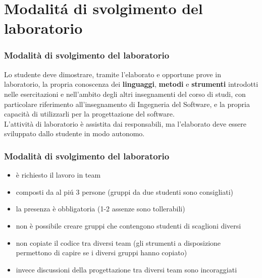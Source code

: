 \documentclass{beamer}
\begin{document}
\section{Modalit\' a di svolgimento del laboratorio}
\begin{frame}
\frametitle{Modalit\` a di svolgimento del laboratorio}


 Lo studente deve dimostrare, tramite l'elaborato e opportune prove in
 laboratorio, la propria conoscenza dei \textbf{linguaggi},
 \textbf{metodi} e \textbf{strumenti} introdotti nelle esercitazioni e
 nell'ambito degli altri insegnamenti del corso di studi, con
 particolare riferimento all'insegnamento di Ingegneria del Software,
 e la propria capacit\` a di utilizzarli per la progettazione del
 software.\\

 L'attivit\` a di laboratorio \`e assistita dai responsabili, ma
 l'elaborato deve essere sviluppato dallo studente in modo autonomo.
\end{frame}


\begin{frame}
\frametitle{Modalit\` a di svolgimento del laboratorio}
\begin{itemize}
\item \` e richiesto il lavoro in team
\item composti da al pi\' u 3 persone
  (gruppi da due studenti sono consigliati)
\item la presenza \`e obbligatoria (1-2 assenze sono tollerabili) 
\item non \` e possibile creare gruppi che contengono studenti di
  scaglioni diversi
\item non copiate il codice tra diversi team (gli strumenti a disposizione
  permettono di capire se i diversi gruppi hanno copiato)
\item invece discussioni della progettazione tra diversi team sono incoraggiati
\end{itemize}
\end{frame}
\end{document}
